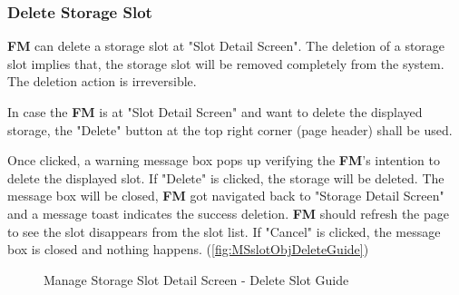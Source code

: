 \subsubsection{Delete Storage Slot}

\textbf{FM} can delete a storage slot at "Slot Detail Screen". 
The deletion of a storage slot implies that, the storage slot will be removed completely from the system. The deletion action is irreversible. 

In case the \textbf{FM} is at "Slot Detail Screen" and want to delete the displayed storage, the "Delete" button at the top right corner (page header) shall be used. 

Once clicked, a warning message box pops up verifying the \textbf{FM}'s intention to delete the displayed slot. If "Delete" is clicked, the storage will be deleted. The message box will be closed, \textbf{FM} got navigated back to "Storage Detail Screen" and a message toast indicates the success deletion. \textbf{FM} should refresh the page to see the slot disappears from the slot list. If "Cancel" is clicked, the message box is closed and nothing happens.
(\autoref{fig:MSslotObjDeleteGuide})

\begin{figure}[H]
	\centering

    \vspace{10pt}
    
    \caption{Manage Storage Slot Detail Screen - Delete Slot Guide}
	\label{fig:MSslotObjDeleteGuide}
\end{figure}


